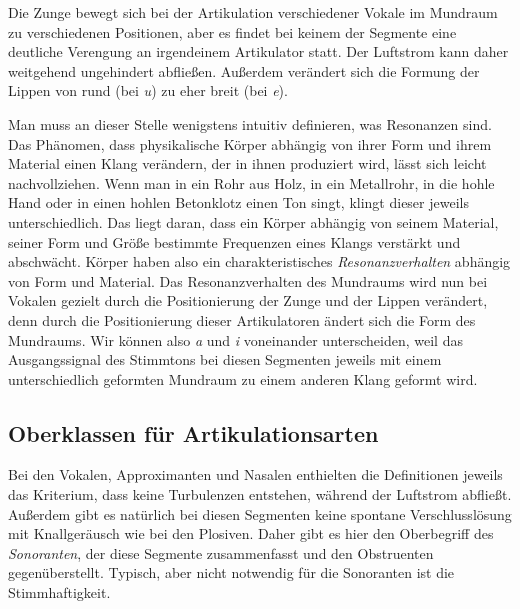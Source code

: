 Die Zunge bewegt sich bei der Artikulation verschiedener Vokale im Mund\-raum zu verschiedenen Positionen, aber es findet bei keinem der Segmente eine deutliche Verengung an irgendeinem Artikulator statt.
Der Luftstrom kann daher weitgehend ungehindert abfließen.
Außerdem verändert sich die Formung der Lippen von rund (\zB bei \textit{u}) zu eher breit (\zB bei \textit{e}).


Man muss an dieser Stelle wenigstens intuitiv definieren, was Resonanzen sind.
Das Phänomen, dass physikalische Körper abhängig von ihrer Form und ihrem Material einen Klang verändern, der in ihnen produziert wird, lässt sich leicht nachvollziehen.
Wenn man in ein Rohr aus Holz, in ein Metallrohr, in die hohle Hand oder in einen hohlen Betonklotz einen Ton singt, klingt dieser jeweils unterschiedlich.
Das liegt daran, dass ein Körper abhängig von seinem Material, seiner Form und Größe bestimmte Frequenzen eines Klangs verstärkt und abschwächt.
Körper haben also ein charakteristisches \textit{Resonanzverhalten} abhängig von Form und Material.
Das Resonanzverhalten des Mundraums wird nun bei Vokalen gezielt durch die Positionierung der Zunge und der Lippen verändert, denn durch die Positionierung dieser Artikulatoren ändert sich die Form des Mundraums.
Wir können also \textit{a} und \textit{i} voneinander unterscheiden, weil das Ausgangssignal des Stimmtons bei diesen Segmenten jeweils mit einem unterschiedlich geformten Mundraum zu einem anderen Klang geformt wird.

\subsection{Oberklassen für Artikulationsarten}

\label{sec:oberklassenfuerartikulationsarten}

Bei den Vokalen, Approximanten und Nasalen enthielten die Definitionen jeweils das Kriterium, dass keine Turbulenzen entstehen, während der Luftstrom abfließt.
Außerdem gibt es natürlich bei diesen Segmenten keine spontane Verschlusslösung mit Knallgeräusch wie bei den Plosiven.
Daher gibt es hier den Oberbegriff des \textit{Sonoranten}, der diese Segmente zusammenfasst und den Obstruenten gegenüberstellt.
Typisch, aber nicht notwendig für die Sonoranten ist die Stimmhaftigkeit.

